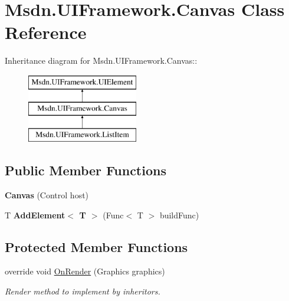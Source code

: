 \hypertarget{class_msdn_1_1_u_i_framework_1_1_canvas}{
\section{Msdn.UIFramework.Canvas Class Reference}
\label{class_msdn_1_1_u_i_framework_1_1_canvas}
}
Inheritance diagram for Msdn.UIFramework.Canvas::\begin{figure}[H]
\begin{center}
\leavevmode
\includegraphics[height=3cm]{class_msdn_1_1_u_i_framework_1_1_canvas}
\end{center}
\end{figure}
\subsection*{Public Member Functions}
\begin{DoxyCompactItemize}
\item 
\hypertarget{class_msdn_1_1_u_i_framework_1_1_canvas_af0248a03dc3f6c78bde09c5db92129ca}{
{\bfseries Canvas} (Control host)}
\label{class_msdn_1_1_u_i_framework_1_1_canvas_af0248a03dc3f6c78bde09c5db92129ca}

\item 
\hypertarget{class_msdn_1_1_u_i_framework_1_1_canvas_aebd4fe659f571a8d016b3d473706d218}{
T {\bfseries AddElement$<$ T $>$} (Func$<$ T $>$ buildFunc)}
\label{class_msdn_1_1_u_i_framework_1_1_canvas_aebd4fe659f571a8d016b3d473706d218}

\end{DoxyCompactItemize}
\subsection*{Protected Member Functions}
\begin{DoxyCompactItemize}
\item 
override void \hyperlink{class_msdn_1_1_u_i_framework_1_1_canvas_af1a17712fcb11abb9200f7780aa66136}{OnRender} (Graphics graphics)
\begin{DoxyCompactList}\small\item\em Render method to implement by inheritors. \item\end{DoxyCompactList}\end{DoxyCompactItemize}
